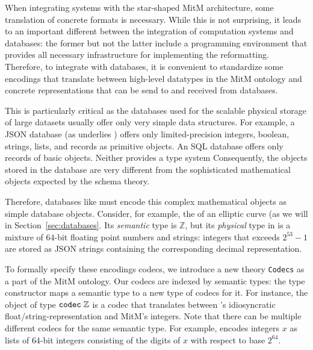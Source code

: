 
When integrating systems with the star-shaped MitM architecture, some translation of concrete formats is necessary.
While this is not surprising, it leads to an important different between the integration of computation systems and databases: the former but not the latter include a programming environment that provides all necessary infrastructure for implementing the reformatting.
Therefore, to integrate with databases, it is convenient to standardize some encodings that translate between high-level datatypes in the MitM ontology and concrete representations that can be send to and received from databases.

This is particularly critical as the databases used for the scalable physical storage of large datasets usually offer only very simple data structures.
For example, a JSON database (as underlies \lmfdb) offers only limited-precision integers, boolean, strings, lists, and records as primitive objects.
An SQL database offers only records of basic objects.
Neither provides a type system
Consequently, the objects stored in the database are very different from the sophisticated mathematical objects expected by the schema theory.

Therefore, databases like \lmfdb must encode this complex mathematical objects as simple database objects.
Consider, for example, the  of an elliptic curve (as we will in Section~\ref{sec:databases}.
Its \emph{semantic} type is $\mathbb{Z}$, but its \emph{physical} type in \lmfdb is  a mixture of $64$-bit floating point numbers and strings:
integers that exceeds $2^{53}-1$ are stored as JSON strings containing the corresponding decimal representation.


To formally specify these encodings codecs, we introduce a new \ommt theory \texttt{Codecs} as a part of the MitM ontology.
Our codecs are indexed by semantic types: the type constructor \codectt maps a semantic type to a new type of codecs for it.
For instance, the object  of type $\codectt\;\mathbb{Z}$ is a codec that translates between \lmfdb's idiosyncratic float/string-representation and MitM's integers.
Note that there can be multiple different codecs for the same semantic type.
For example,  encodes integers $x$ as lists of $64$-bit integers consisting of the digits of $x$ with respect to base $2^{64}$.

